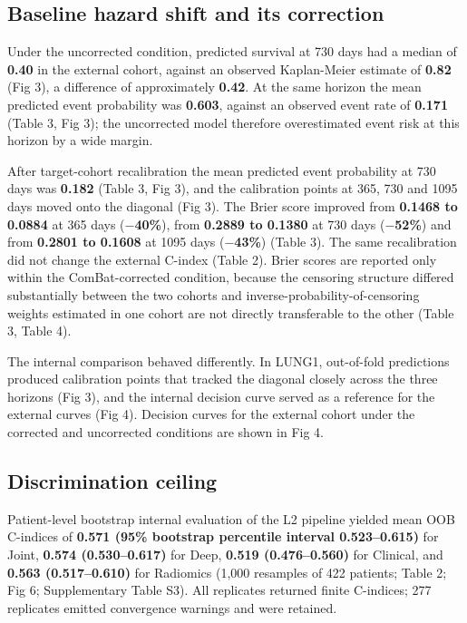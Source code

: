 \documentclass[a4paper,fleqn]{cas-sc}
\begin{document}
\subsection{Baseline hazard shift and its correction}

Under the uncorrected condition, predicted survival at 730 days had a median of \textbf{0.40} in the external cohort, against an observed Kaplan-Meier estimate of \textbf{0.82} (Fig 3), a difference of approximately \textbf{0.42}. At the same horizon the mean predicted event probability was \textbf{0.603}, against an observed event rate of \textbf{0.171} (Table 3, Fig 3); the uncorrected model therefore overestimated event risk at this horizon by a wide margin.

After target-cohort recalibration the mean predicted event probability at 730 days was \textbf{0.182} (Table 3, Fig 3), and the calibration points at 365, 730 and 1095 days moved onto the diagonal (Fig 3). The Brier score improved from \textbf{0.1468 to 0.0884} at 365 days (\textbf{$-$40\%}), from \textbf{0.2889 to 0.1380} at 730 days (\textbf{$-$52\%}) and from \textbf{0.2801 to 0.1608} at 1095 days (\textbf{$-$43\%}) (Table 3). The same recalibration did not change the external C-index (Table 2). Brier scores are reported only within the ComBat-corrected condition, because the censoring structure differed substantially between the two cohorts and inverse-probability-of-censoring weights estimated in one cohort are not directly transferable to the other (Table 3, Table 4).

The internal comparison behaved differently. In LUNG1, out-of-fold predictions produced calibration points that tracked the diagonal closely across the three horizons (Fig 3), and the internal decision curve served as a reference for the external curves (Fig 4). Decision curves for the external cohort under the corrected and uncorrected conditions are shown in Fig 4.

\subsection{Discrimination ceiling}

Patient-level bootstrap internal evaluation of the L2 pipeline yielded mean OOB C-indices of \textbf{0.571 (95\% bootstrap percentile interval 0.523--0.615)} for Joint, \textbf{0.574 (0.530--0.617)} for Deep, \textbf{0.519 (0.476--0.560)} for Clinical, and \textbf{0.563 (0.517--0.610)} for Radiomics (1,000 resamples of 422 patients; Table 2; Fig 6; Supplementary Table S3). All replicates returned finite C-indices; 277 replicates emitted convergence warnings and were retained.
\end{document}
